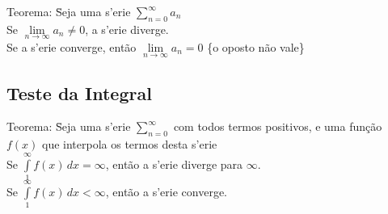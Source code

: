 \documentclass{article}
\begin{document}
\begin{tabbing}
  Teorema: \=Seja uma s\a'{e}rie $\sum\limits_{n=0}^\infty a_n$ \\[5pt]
  \>Se $\lim\limits_{n\to\infty} a_n \neq 0$, a s\a'{e}rie diverge. \\[5pt]
  \>Se a s\a'{e}rie converge, ent\~ao $\lim\limits_{n\to\infty} a_n = 0$ \quad\{o oposto n\~ao vale\}
\end{tabbing}

\subsection{Teste da Integral}

\begin{tabbing}
  Teorema: \=Seja uma s\a'erie $\sum\limits_{n=0}^\infty$ com todos termos positivos, e uma fun\c{c}\~ao $f(x)$ que interpola os termos desta s\a'erie \\
  \> Se $\int\limits_1^\infty f(x)\,dx = \infty$, ent\~ao a s\a'erie diverge para $\infty$. \\
  \> Se $\int\limits_1^\infty f(x)\,dx < \infty$, ent\~ao a s\a'erie converge.
\end{tabbing}
\end{document}
